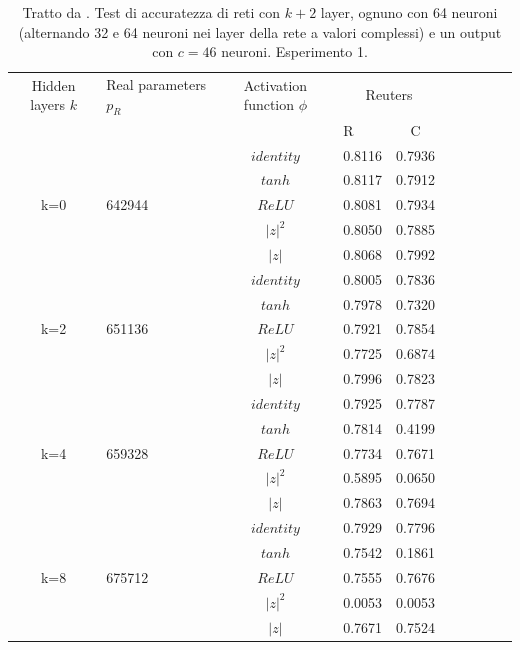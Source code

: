 \documentclass[a4paper,12pt]{report}
\begin{document}
 \newpage
 
 \begin{table}[h]
  \centering
  \begin{tabular}{cp{} cp{}   cp{} cp{} cp{}}
   \cline{1-5}
   Hidden layers $k$ & Real parameters $p_R$ & Activation function $\phi$ & \multicolumn{2}{c}{Reuters}\\
   \cline{4-5}
   & & & R & C \\
   \cline{1-5}
   & & $identity$ & 0.8116 & 0.7936 \\
   \cline{3-5}
   & & $tanh$ & 0.8117 & 0.7912 \\
   \cline{3-5}
   k=0 & 642944 & $ReLU$ & 0.8081 & 0.7934 \\
   \cline{3-5}
   & & $|z|^2$ & 0.8050 & 0.7885 \\
   \cline{3-5}
   & & $|z|$ & 0.8068 & 0.7992 \\
   \cline{1-5}
  
   & & $identity$ & 0.8005 & 0.7836 \\
   \cline{3-5}
   & & $tanh$ & 0.7978 & 0.7320 \\
   \cline{3-5}
   k=2 & 651136 & $ReLU$ & 0.7921 & 0.7854 \\
   \cline{3-5}
   & & $|z|^2$ & 0.7725 & 0.6874 \\
   \cline{3-5}
   & & $|z|$ & 0.7996 & 0.7823 \\
   \cline{1-5}
  
   & & $identity$ & 0.7925 & 0.7787 \\
   \cline{3-5}
   & & $tanh$ & 0.7814 & 0.4199 \\
   \cline{3-5}
   k=4 & 659328 & $ReLU$ & 0.7734 & 0.7671 \\
   \cline{3-5}
   & & $|z|^2$ & 0.5895 & 0.0650 \\
   \cline{3-5}
   & & $|z|$ & 0.7863 & 0.7694 \\
   \cline{1-5}
   
   & & $identity$ & 0.7929 & 0.7796 \\
   \cline{3-5}
   & & $tanh$ & 0.7542 & 0.1861 \\
   \cline{3-5}
   k=8 & 675712 & $ReLU$ & 0.7555 & 0.7676 \\
   \cline{3-5}
   & & $|z|^2$ & 0.0053 & 0.0053 \\
   \cline{3-5}
   & & $|z|$ & 0.7671 & 0.7524 \\
   \cline{1-5}
  \end{tabular}
  \caption{Tratto da \cite{monning2018evaluation}. Test di accuratezza di reti con $k+2$ layer, ognuno con 64 neuroni (alternando 32 e 64 neuroni nei layer della rete a valori complessi) e un output con $c=46$ neuroni. Esperimento 1.}
  \label{Reuters1Tab}
 \end{table}
 
\end{document}
